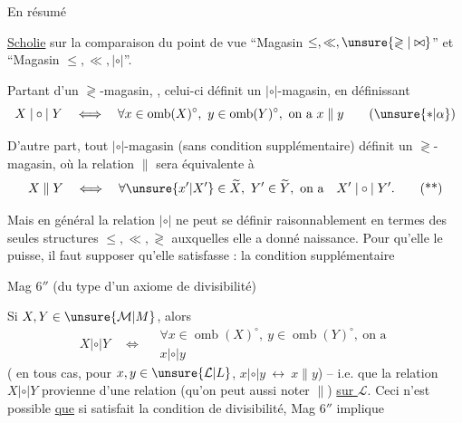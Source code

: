 En résumé

\uline{Scholie} sur la comparaison du point de vue ``Magasin $\leq,\ll,\unsure{\gtrless|\bowtie}$'' et ``Magasin $\leq,\ll,\mathrel{|\circ|}$''.

Partant d'un $\gtrless$-magasin, , celui-ci définit un $\mathrel{|\circ|}$-magasin, en définissant
\[
X\mathrel{|\circ|}Y\quad\Longleftrightarrow\quad\forall x\in\operatorname{omb}(X)^{\circ},\ y\in\operatorname{omb}(Y)^{\circ},\ \text{on a }x\parallel y
\tag*{($\unsure{*|\alpha}$)}
\]

D'autre part, tout $\mathrel{|\circ|}$-magasin (sans condition supplémentaire) définit un $\gtrless$-magasin, où  la relation $\parallel$ sera équivalente à
\[
X\parallel Y\quad\Longleftrightarrow\quad\forall\unsure{x'|X'}\in\widetilde X,\ Y'\in\widetilde Y,\ \text{on a}\quad X'\mathrel{|\circ|}Y'.
\tag*{(**)}
\]

Mais en général  la relation $\mathrel{|\circ|}$ ne peut se définir raisonnablement en termes des seules structures $\leq,\ll,\gtrless$ auxquelles elle a donné naissance. Pour qu'elle le puisse, il faut supposer qu'elle satisfasse : la condition supplémentaire

Mag $6''$ (du type d'un axiome de divisibilité)

Si $X,Y\in\unsure{\mathcal M|M}$, alors
\[
X\mathrel{|\circ|}Y\quad\Longleftrightarrow\quad
\begin{gathered}
\forall x\in\operatorname{omb}(X)^{\circ},\ y\in\operatorname{omb}(Y)^{\circ},\ \text{on a}\\
x\mathrel{|\circ|}y
\end{gathered}
\tag*{(***)}
\]
( en tous cas, pour $x,y\in\unsure{\mathcal L|L}$, $x\mathrel{|\circ|}y\ \longleftrightarrow\ x\parallel y$) -- i.e. que la relation $X\mathrel{|\circ|}Y$ provienne d'une relation (qu'on peut aussi noter $\parallel$) \uline{sur $\mathcal L$}. Ceci n'est possible \uline{que} si  satisfait la condition de divisibilité,  Mag $6''$ implique
